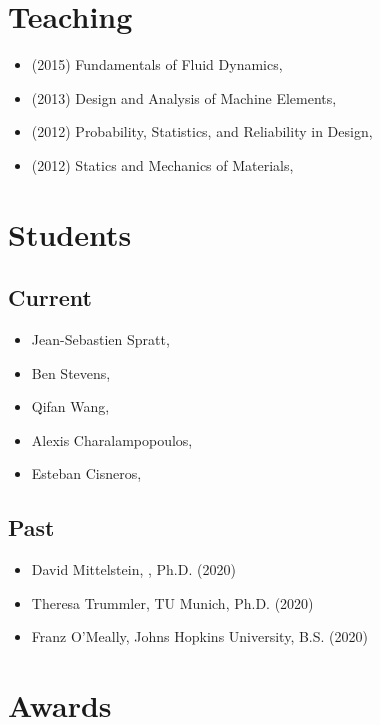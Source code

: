 \section{Teaching}

\begin{itemize}
    \item (2015) Fundamentals of Fluid Dynamics, \UIUC
    \item (2013) Design and Analysis of Machine Elements, \UMD
    \item (2012) Probability, Statistics, and Reliability in Design, \UMD
    \item (2012) Statics and Mechanics of Materials, \UMD
\end{itemize}


\section{Students}

\subsection{Current}

\begin{itemize}
    \item Jean-Sebastien Spratt, \CIT
    \item Ben Stevens, \CIT
    \item Qifan Wang, \CIT
    \item Alexis Charalampopoulos, \MIT
    \item Esteban Cisneros, \UIUC
\end{itemize}

\subsection{Past}

\begin{itemize}
    \item David Mittelstein, \CIT, Ph.D. (2020)
    \item Theresa Trummler, TU Munich, Ph.D. (2020)
    \item Franz O'Meally, Johns Hopkins University, B.S. (2020)
\end{itemize}

\section{Awards}


